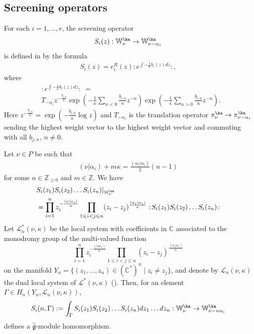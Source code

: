 \documentclass{amsart}
\newcommand{\Wak}[2]{\mathbb{W}_{#1}^{#2}}
\newcommand{\+}{\mathop{\oplus}}
\renewcommand{\*}{{\otimes}}
\newcommand{\mc}{\mathcal}
\newcommand{\mf}{\mathfrak}
\newcommand{\affg}{\widehat{\mf{g}}}
\newcommand{\Z}{\mathbb{Z}}
\newcommand{\C}{\mathbb{C}}
\newcommand{\ra}{\rightarrow}
\def\leq{\leqslant}
\def\geq{\geqslant}
\theoremstyle{theorem}
\theoremstyle{remark}
\numberwithin{equation}{section}
\begin{document}
\subsection{Screening operators}

For each $i=1,\dots, r$,
the screening operator
$$
S_i(z): \Wak{\nu}{\ka}\ra \Wak{\nu-\alpha_i}{\ka}
$$
is defined in \cite{FF:wak,Fre05} by the formula
\begin{align}    \label{Si}
S_{i}(z)= e_i^R(z):e^{\int -\frac{1}{\kappa}b_i(z)dz}:,
\end{align}
where
\begin{align}
&:\! e^{\int -\frac{1}{\kappa}b_i(z)dz} \! : \; =
\label{eq:eb}
\\&T_{-\alpha_i} z^{-\frac{b_{i,0}}{\kappa}}
\exp\left(-\frac{1}{\kappa}\sum_{n<0}\frac{b_{i,n}}{n}z^{-n}\right)
\exp\left(-\frac{1}{\kappa}\sum_{n>0}\frac{b_{i,n}}{n}z^{-n}\right).
\nonumber
\end{align}
Here
$z^{-\frac{b_{i,0}}{\kappa}}=\exp(-\frac{b_{i,0}}{\kappa}\log z)$
and $T_{-\alpha_i}$ is the translation operator
$\pi^\ka_{\nu}\ra \pi^\ka_{\nu-\alpha_i}$
sending the highest weight vector to the highest weight vector and
commuting with all $b_{j,n}$, $n\ne 0$.

Let $\nu\in P$ be such that
\begin{align}
(\nu|\alpha_i)+m\kappa=\frac{(\alpha_i|\alpha_i)}{2}(n-1)
\label{eq:weight}
\end{align}
for some $n\in \Z_{\geq 0}$ and $m\in \Z$.
We have
\begin{align*}
&S_i(z_1)S_i(z_2)\dots S_i(z_{n})|_{\Wak{\nu}{\ka}}\\
&=\prod_{i=1}^{n}z_i^{-\frac{(\nu|\alpha_i)}{\kappa}}
\prod_{1\leq i<j\leq n}(z_i-z_j)^{\frac{(\alpha_i|\alpha_i)}{\kappa}}
:\! S_i(z_1)S_i(z_2)\dots S_i(z_n) \! :
\end{align*}
Let $\mc{L}^*_{n}(\nu,\kappa)$ be the local system with coefficients
in $\C$ associated to the monodromy group of the multi-valued function
$$\prod_{i=1}^{n}z_i^{-\frac{(\nu|\alpha_i)}{\kappa}}
\prod_{1\leq i<j\leq n}(z_i-z_j)^{\frac{(\alpha_i|\alpha_i)}{\kappa}}$$
on the manifold
$Y_{n}=\{(z_1,\dots, z_{n})\in (\C^*)^{n}\mid z_i\neq z_j\}$,
and denote by $\mc{L}_{n}(\nu,\kappa)$ the dual local system of
$\mc{L}^*(\nu,\kappa)$
(\cite{AomKit11}).
Then, for an element $\Gamma\in H_{n}(Y_{n},\mc{L}_n(\nu,\kappa))$,
\begin{align}
S_i(n,\Gamma):=\int_{\Gamma} S_i(z_1)S_i(z_2)\dots S_i(z_n) dz_1\dots
dz_n:\Wak{\nu}{\ka}\ra \Wak{\nu-n\alpha_i}{\ka}
\label{eq:intertwiner2}
\end{align}
defines a
$\affg$-module homomorphism.
\end{document}
